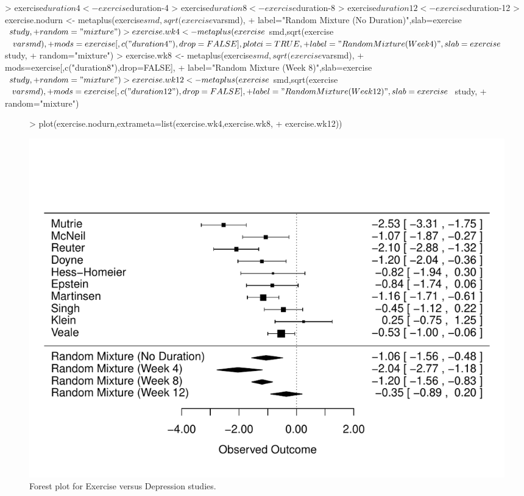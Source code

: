 \documentclass{article}
\begin{document}
\begin{Schunk}
\begin{Sinput}
> exercise$duration4 <- exercise$duration-4
> exercise$duration8 <- exercise$duration-8
> exercise$duration12 <- exercise$duration-12
> exercise.nodurn <- metaplus(exercise$smd,sqrt(exercise$varsmd),
+     label="Random Mixture (No Duration)",slab=exercise$study,
+     random="mixture")
> exercise.wk4 <- metaplus(exercise$smd,sqrt(exercise$varsmd),
+     mods=exercise[,c("duration4"),drop=FALSE],plotci=TRUE,
+     label="Random Mixture (Week 4)",slab=exercise$study,
+     random="mixture")
> exercise.wk8 <- metaplus(exercise$smd,sqrt(exercise$varsmd),
+     mods=exercise[,c("duration8"),drop=FALSE],
+     label="Random Mixture (Week 8)",slab=exercise$study,
+     random="mixture")
> exercise.wk12 <- metaplus(exercise$smd,sqrt(exercise$varsmd),
+     mods=exercise[,c("duration12"),drop=FALSE],
+     label="Random Mixture (Week 12)",slab=exercise$study,
+     random="mixture")
\end{Sinput}
\end{Schunk}


\begin{figure}
  \centering
\begin{Schunk}
\begin{Sinput}
> plot(exercise.nodurn,extrameta=list(exercise.wk4,exercise.wk8,
+       exercise.wk12))
\end{Sinput}
\end{Schunk}
\includegraphics{metaplus-examples-018}
  \caption{Forest plot for Exercise versus Depression studies.}
  \label{fig:forest3}
\end{figure}


\end{document}
